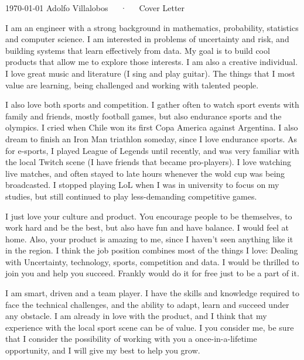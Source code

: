 \documentclass[11pt, a4paper]{awesome-cv}
\begin{document}
\makecvheader[R]

\makecvfooter
  {\today}
  {Adolfo Villalobos~~~·~~~Cover Letter}
  {}

\makelettertitle

\begin{cvletter}


I am an engineer with a strong background in mathematics, probability, statistics and computer science. 
I am interested in problems of uncertainty and risk, and building systems that learn effectively from data. 
My goal is to build cool products that allow me to explore those interests.  I am also a creative individual. I love great music and literature (I sing and play guitar). 
The things that I most value are learning, being challenged and working 
with talented people.

I also love both sports and competition.  I gather often to watch sport events with family and friends, mostly football games, but also endurance sports and the olympics.
I cried when Chile won its first Copa America against
 Argentina. I also dream to finish an Iron Man triathlon someday, since I love endurance sports. As for e-sports, I played League of Legends until recently, and was very familiar
 with the local Twitch scene (I have friends that became pro-players). I love watching live matches, and often stayed to late hours whenever the wold cup was being broadcasted. 
 I stopped playing LoL when I was in university to focus on my studies, but still continued to play less-demanding competitive games. 


I just love your culture and product. You encourage people to be themselves, to work hard and be the best, but
also have fun and have balance. I would feel at home. 
Also, your product is amazing to me, since I haven't seen anything like it in the region. 
I think the job position combines most of the things I love: 
Dealing with Uncertainty, technology, sports, competition and data. I would be thrilled to join you and help you succeed. Frankly would do it for free just to be a part of it. 


I am smart, driven and a team player. I have the skills and knowledge required to face the technical challenges, and the ability to
adapt, learn and succeed under any obstacle.  I am already in love with the product, and I think that my experience with the local sport scene can be of value.
I you consider me, be sure that I consider the possibility of working with you a once-in-a-lifetime opportunity, and I will give my best to help you grow.
 

\end{cvletter}


\makeletterclosing
\end{document}
